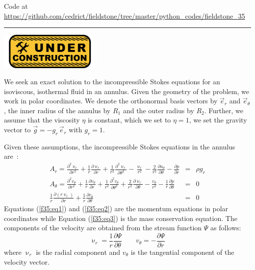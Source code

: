 

\begin{center}
Code at \url{https://github.com/cedrict/fieldstone/tree/master/python_codes/fieldstone_35}
\end{center}

\par\noindent\rule{\textwidth}{0.4pt}

\includegraphics[width=5cm]{images/under_construction}


We seek an exact solution to the incompressible Stokes equations for an isoviscous, 
isothermal fluid in an  annulus.
Given the geometry of the problem, we work in polar coordinates.
We denote the orthonormal basis vectors by $\vec{e}_r$ and $\vec{e}_\theta$, 
the inner radius of the annulus by $R_1$ and the outer radius by $R_2$.
Further, we assume that the viscosity $\eta$ is constant, 
which we set to $\eta = 1$, we set the gravity vector to $\vec{g} = -g_r \, \vec{e}_r$ with $g_r = 1$. 

Given these assumptions, the incompressible Stokes equations in the annulus are~\cite{scto01}:
\begin{eqnarray}
A_r =     \frac{\partial^2 \upnu_r}{\partial r^2} + \frac{1}{r} \frac{\partial \upnu_r}{\partial r} +   
      \frac{1}{r^2} \frac{\partial^2 \upnu_r}{\partial \theta^2}
    - \frac{\upnu_r}{r^2} - \frac{2}{r^2} \frac{\partial u_\theta}{\partial \theta} 
-\frac{\partial p}{\partial r}  &=& \rho g_r \label{f35:eq1} \\
A_\theta=
\frac{\partial^2 v_\theta}{\partial r^2} + \frac{1}{r} \frac{\partial v_\theta}{\partial r} + \frac{1}{r^2} \frac{\partial^2 v_\theta}{\partial \theta^2}
+\frac{2}{r^2} \frac{\partial \upnu_r}{\partial \theta} - \frac{v_\theta}{r^2} 
-\frac{1}{r}\frac{\partial p}{\partial \theta} &=& 0
\label{f35:eq2} \\
\frac{1}{r} \frac{\partial (r\upnu_r)}{\partial r} + \frac{1}{r} \frac{\partial v_\theta}{\partial \theta} &=&0 \label{f35:eq3}
\end{eqnarray}
Equations (\ref{f35:eq1}) and (\ref{f35:eq2}) are the momentum equations in polar coordinates while
Equation (\ref{f35:eq3}) is the mass conservation equation.
The components of the velocity are obtained from the stream function $\Psi$ as follows:
\[
\upnu_r = \frac{1}{r}\frac{\partial \Psi}{\partial \theta}
\quad\quad
v_\theta = - \frac{\partial \Psi}{\partial r}
\]
where $\upnu_r$ is the radial component and $v_\theta$ is the tangential component of the velocity vector.


